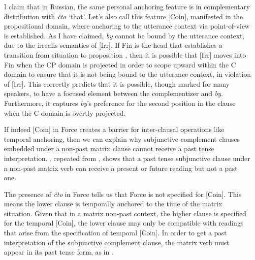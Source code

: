 \documentclass[output=paper,
modfonts,
newtxmath,
hidelinks,
]{langscibook}
\begin{document}
I claim that in Russian, the same personal anchoring feature is in complementary distribution with \textit{čto} `that'. Let’s also call this feature [Coin], manifested in the propositional domain, where anchoring to the utterance context via point-of-view is established. As I have claimed, \textit{by} cannot be bound by the utterance context, due to the irrealis semantics of [Irr]. If Fin is the head that establishes a transition from situation to proposition \citep{RamchandSvenonius2014}, then it is possible that [Irr] moves into Fin when the CP domain is projected in order to scope upward within the C domain to ensure that it is not being bound to the utterance context, in violation of [Irr]. This correctly predicts that it is possible, though marked for many speakers, to have a focused element between the complementizer and \textit{by}. Furthermore, it captures \textit{by}’s preference for the second position in the clause when the C domain is overtly projected. 

If indeed [Coin] in Force creates a barrier for inter-clausal operations like temporal anchoring, then we can explain why subjunctive complement clauses embedded under a non-past matrix clause cannot receive a past tense interpretation. , repeated from , shows that a past tense subjunctive clause under a non-past matrix verb can receive a present or future reading but not a past one.

\ea \label{10:ex33}
    \hfill \citep[8]{Asarina2006}
	\z
\z

\noindent The presence of \textit{čto} in Force tells us that Force is not specified for [Coin]. This means the lower clause is temporally anchored to the time of the matrix situation. Given that in a matrix non-past context, the higher clause is specified for the temporal [Coin], the lower clause may only be compatible with readings that arise from the specification of temporal [Coin]. In order to get a past interpretation of the subjunctive complement clause, the matrix verb must appear in its past tense form, as in .
\end{document}
